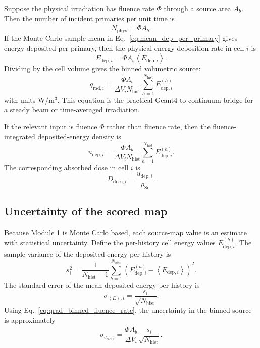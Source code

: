 \documentclass[11pt]{article}
\newcommand{\PhiFlu}{\Phi}
\newcommand{\Phidot}{\dot{\Phi}}
\newcommand{\rhoSi}{\rho_{\mathrm{Si}}}
\begin{document}
Suppose the physical irradiation has fluence rate $\Phidot$ through a source area $A_b$. Then the number of incident primaries per unit time is
\begin{equation}
\dot{N}_{\mathrm{phys}} = \Phidot A_b.
\end{equation}
If the Monte Carlo sample mean in Eq.~\eqref{eq:mean_dep_per_primary} gives energy deposited per primary, then the physical energy-deposition rate in cell $i$ is
\begin{equation}
\dot{E}_{\mathrm{dep},i}
=
\Phidot A_b \left<E_{\mathrm{dep},i}\right>.
\end{equation}
Dividing by the cell volume gives the binned volumetric source:
\begin{equation}
\boxed{
\dot{q}_{\mathrm{rad},i}
=
\frac{\Phidot A_b}{\Delta V_i N_{\mathrm{hist}}}
\sum_{h=1}^{N_{\mathrm{hist}}} E_{\mathrm{dep},i}^{(h)}
}
\label{eq:qrad_binned_fluence_rate}
\end{equation}
with units W/m$^3$. This equation is the practical Geant4-to-continuum bridge for a steady beam or time-averaged irradiation.

If the relevant input is fluence $\PhiFlu$ rather than fluence rate, then the fluence-integrated deposited-energy density is
\begin{equation}
 u_{\mathrm{dep},i}
=
\frac{\PhiFlu A_b}{\Delta V_i N_{\mathrm{hist}}}
\sum_{h=1}^{N_{\mathrm{hist}}} E_{\mathrm{dep},i}^{(h)}.
\label{eq:fluence_integrated_energy_density}
\end{equation}
The corresponding absorbed dose in cell $i$ is
\begin{equation}
D_{\mathrm{dose},i}
=
\frac{u_{\mathrm{dep},i}}{\rhoSi}.
\label{eq:binned_dose}
\end{equation}

\subsection{Uncertainty of the scored map}

Because Module 1 is Monte Carlo based, each source-map value is an estimate with statistical uncertainty. Define the per-history cell energy values $E_{\mathrm{dep},i}^{(h)}$. The sample variance of the deposited energy per history is
\begin{equation}
 s_i^2
=
\frac{1}{N_{\mathrm{hist}}-1}
\sum_{h=1}^{N_{\mathrm{hist}}}
\left(E_{\mathrm{dep},i}^{(h)}-\left<E_{\mathrm{dep},i}\right>\right)^2.
\end{equation}
The standard error of the mean deposited energy per history is
\begin{equation}
\sigma_{\left<E\right>,i}
=
\frac{s_i}{\sqrt{N_{\mathrm{hist}}}}.
\end{equation}
Using Eq.~\eqref{eq:qrad_binned_fluence_rate}, the uncertainty in the binned source is approximately
\begin{equation}
\sigma_{\dot{q}_{\mathrm{rad},i}}
=
\frac{\Phidot A_b}{\Delta V_i}\frac{s_i}{\sqrt{N_{\mathrm{hist}}}}.
\end{equation}
\end{document}

